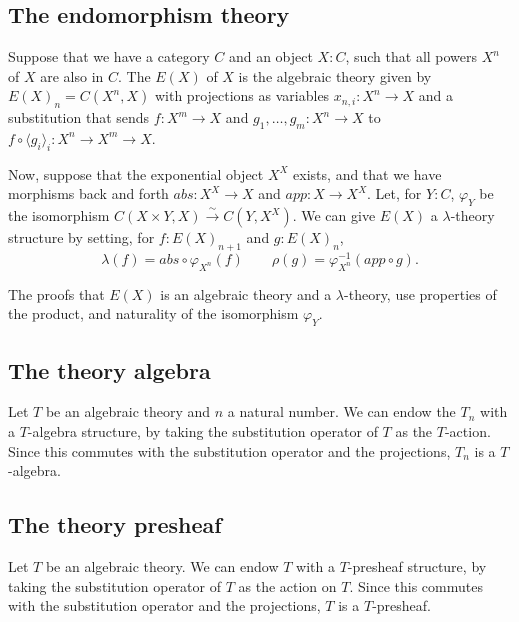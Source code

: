 \subsection{The endomorphism theory}

\begin{definition}
  Suppose that we have a category $ C $ and an object $ X: C $, such that all powers $ X^n $ of $ X $ are also in $ C $.
  The  $ E(X) $ of $ X $ is the algebraic theory given by $ E(X)_n = C(X^n, X) $ with projections as variables $ x_{n, i}: X^n \to X $ and a substitution that sends $ f: X^m \to X $ and $ g_1, \dots, g_m: X^n \to X $ to $ f \circ \langle g_i \rangle_i: X^n \to X^m \to X $.
\end{definition}

\begin{definition}
  Now, suppose that the exponential object $ X^X $ exists, and that we have morphisms back and forth $ abs: X^X \to X $ and $ app: X \to X^X $. Let, for $ Y: C $, $ \varphi_Y $ be the isomorphism $ C(X \times Y, X) \xrightarrow{\sim} C(Y, X^X) $.
  We can give $ E(X) $ a $ \lambda $-theory structure by setting, for $ f: E(X)_{n + 1} $ and $ g: E(X)_n $,
  \[ \lambda(f) = abs \circ \varphi_{X^n}(f) \qquad \rho(g) = \varphi_{X^n}^{-1}(app \circ g). \]
\end{definition}

The proofs that $ E(X) $ is an algebraic theory and a $ \lambda $-theory, use properties of the product, and naturality of the isomorphism $ \varphi_Y $.

\subsection{The theory algebra}
\begin{example}
  Let $ T $ be an algebraic theory and $ n $ a natural number. We can endow the $ T_n $ with a $ T $-algebra structure, by taking the substitution operator of $ T $ as the $ T $-action. Since this commutes with the substitution operator and the projections, $ T_n $ is a $ T $-algebra.
\end{example}

\subsection{The theory presheaf}
\begin{example}
  Let $ T $ be an algebraic theory. We can endow $ T $ with a $ T $-presheaf structure, by taking the substitution operator of $ T $ as the action on $ T $. Since this commutes with the substitution operator and the projections, $ T $ is a $ T $-presheaf.
\end{example}

